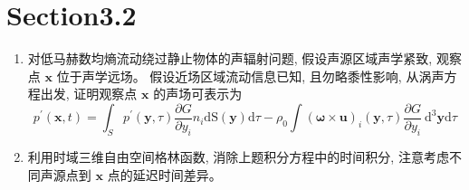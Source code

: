 \section*{Section3.2}

\begin{enumerate}
    \item 对低马赫数均熵流动绕过静止物体的声辐射问题, 
    假设声源区域声学紧致, 观察点 \( \boldsymbol{x} \) 位于声学远场。
    假设近场区域流动信息已知, 且勿略黍性影响, 从涡声方程出发, 
    证明观察点  \( \boldsymbol{x} \)   的声场可表示为
    \[
        p^{\prime}(\mathbf{x}, t)
        = \int_{S} p^{\prime}(\mathbf{y}, \tau) \frac{\partial G}{\partial y_{i}} n_{i} \mathrm{dS}(\mathbf{y}) \mathrm{d} \tau
        -\rho_{0} \int(\boldsymbol{\omega} \times \mathbf{u})_{i}(\mathbf{y}, \tau) \frac{\partial G}{\partial y_{i}} \mathrm{~d}^{3} \mathbf{y} \mathrm{d} \tau
    \]

    
    \item 利用时域三维自由空间格林函数, 消除上题积分方程中的时间积分, 
    注意考虑不同声源点到  \( \boldsymbol{x} \)  点的延迟时间差异。
\end{enumerate}

\clearpage